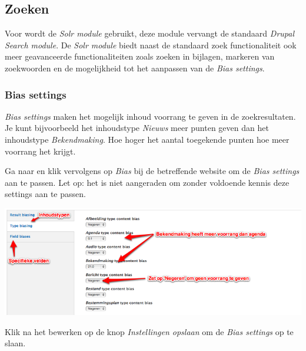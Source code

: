 
\subsection{Zoeken}\label{zoeken}

Voor \drupalpath wordt de \emph{Solr module} gebruikt, deze module vervangt de standaard \emph{Drupal Search module}. 
De \emph{Solr module} biedt naast de standaard zoek functionaliteit ook meer geavanceerde functionaliteiten zoals zoeken in bijlagen, markeren van zoekwoorden en de mogelijkheid tot het aanpassen van de \emph{Bias settings}. 

\subsubsection{Bias settings}

\emph{Bias settings} maken het mogelijk inhoud voorrang te geven in de zoekresultaten. Je kunt bijvoorbeeld het inhoudstype \emph{Nieuws} meer punten geven dan het inhoudstype \emph{Bekendmaking}. Hoe hoger het aantal toegekende punten hoe meer voorrang het krijgt. 

Ga naar  en klik vervolgens op \emph{Bias} bij de betreffende website om de \emph{Bias settings} aan te passen. Let op: het is niet aangeraden om zonder voldoende kennis deze settings aan te passen.

\begin{center}
	\includegraphics[width=\textwidth]{img/bias.png}
\end{center}

Klik na het bewerken op de knop \emph{Instellingen opslaan} om de \emph{Bias settings} op te slaan. 